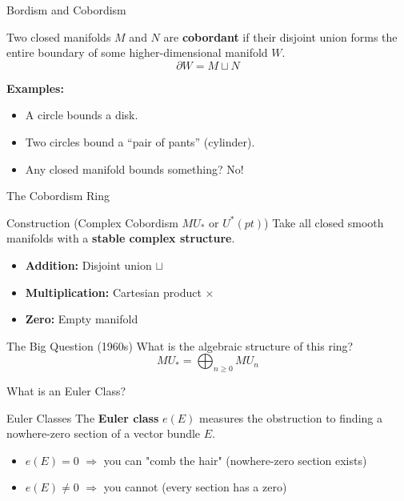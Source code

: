 \documentclass{beamer}
\begin{document}
\begin{frame}{Bordism and Cobordism}
  \begin{definition}
    Two closed manifolds $M$ and $N$ are \textbf{cobordant} if their disjoint union forms the entire boundary of some higher-dimensional manifold $W$.
    \[
      \partial W = M \sqcup N
    \]
  \end{definition}
  \textbf{Examples:}
  \begin{itemize}
    \item A circle bounds a disk.
    \item Two circles bound a ``pair of pants'' (cylinder).
    \item Any closed manifold bounds something? No!
  \end{itemize}
\end{frame}

\begin{frame}{The Cobordism Ring}
  \begin{block}{Construction (Complex Cobordism $MU_*$ or $U^*(pt)$)}
  Take all closed smooth manifolds with a \textbf{stable complex structure}.
  \begin{itemize}
    \item \textbf{Addition:} Disjoint union $\sqcup$
    \item \textbf{Multiplication:} Cartesian product $\times$
    \item \textbf{Zero:} Empty manifold
  \end{itemize}
  \end{block}
  \vfill
  \begin{alertblock}{The Big Question (1960s)}
  What is the algebraic structure of this ring?
  \[
    MU_*=\bigoplus_{n\geq0} MU_n
  \]
  \end{alertblock}
\end{frame}

\begin{frame}{What is an Euler Class?}
  \begin{block}{Euler Classes}
  The \textbf{Euler class} $e(E)$ measures the obstruction to finding a nowhere-zero section of a vector bundle $E$.
  \begin{itemize}
    \item $e(E) = 0$ $\Rightarrow$ you can "comb the hair" (nowhere-zero section exists)
    \item $e(E) \neq 0$ $\Rightarrow$ you cannot (every section has a zero)
  \end{itemize}
  \end{block}
\end{frame}
\end{document}
